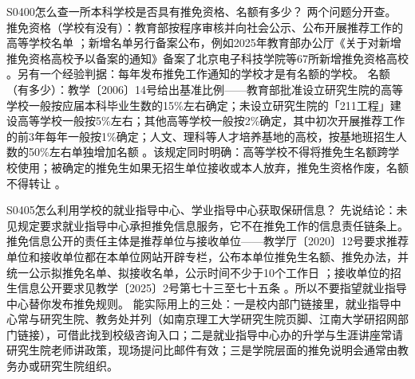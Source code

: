 \begin{qa}{S0400}{怎么查一所本科学校是否具有推免资格、名额有多少？}
两个问题分开查。
推免资格（学校有没有）：教育部按程序审核并向社会公示、公布开展推荐工作的高等学校名单 ；新增名单另行备案公布，例如2025年教育部办公厅《关于对新增推免资格高校予以备案的通知》备案了北京电子科技学院等67所新增推免资格高校 。另有一个经验判据：每年发布推免工作通知的学校才是有名额的学校。
名额（有多少）：教学〔2006〕14号给出基准比例——教育部批准设立研究生院的高等学校一般按应届本科毕业生数的15\%左右确定；未设立研究生院的「211工程」建设高等学校一般按5\%左右；其他高等学校一般按2\%确定，其中初次开展推荐工作的前3年每年一般按1\%确定；人文、理科等人才培养基地的高校，按基地班招生人数的50\%左右单独增加名额 。该规定同时明确：高等学校不得将推免生名额跨学校使用；被确定的推免生如果无招生单位接收或本人放弃，推免生资格作废，名额不得转让 。
\end{qa}

\begin{qa}{S0405}{怎么利用学校的就业指导中心、学业指导中心获取保研信息？}
先说结论：未见规定要求就业指导中心承担推免信息服务，它不在推免工作的信息责任链条上。推免信息公开的责任主体是推荐单位与接收单位——教学厅〔2020〕12号要求推荐单位和接收单位都在本单位网站开辟专栏，公布本单位推免生名额、推免办法，并统一公示拟推免名单、拟接收名单，公示时间不少于10个工作日 ；接收单位的招生信息公开要求见教学〔2025〕2号第七十三至七十五条 。所以不要指望就业指导中心替你发布推免规则。
能实际用上的三处：一是校内部门链接里，就业指导中心常与研究生院、教务处并列（如南京理工大学研究生院页脚、江南大学研招网部门链接），可借此找到校级咨询入口；二是就业指导中心办的升学与生涯讲座常请研究生院老师讲政策，现场提问比邮件有效；三是学院层面的推免说明会通常由教务办或研究生院组织。
\end{qa}

